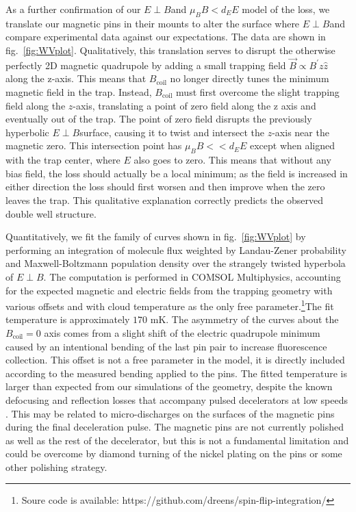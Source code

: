 \documentclass[%
 reprint,
groupedaddress,
 amsmath,amssymb,
 aps,
prl,
]{revtex4-1}
\newcommand{\epb}{$E\!\perp\!B$}
\begin{document}
As a further confirmation of our \epb and $\mu_BB<d_EE$ model of the loss, we translate our magnetic pins in their mounts to alter the surface where \epb and compare experimental data against our expectations. The data are shown in fig.~\ref{fig:WVplot}. Qualitatively, this translation serves to disrupt the otherwise perfectly 2D magnetic quadrupole by adding a small trapping field $\vec{B}\propto B^\prime z\hat{z}$ along the z-axis. This means that $B_\text{coil}$ no longer directly tunes the minimum magnetic field in the trap. Instead, $B_\text{coil}$ must first overcome the slight trapping field along the $z$-axis, translating a point of zero field along the z axis and eventually out of the trap. The point of zero field disrupts the previously hyperbolic \epb surface, causing it to twist and intersect the $z$-axis near the magnetic zero. This intersection point has $\mu_BB<< d_EE$ except when aligned with the trap center, where $E$ also goes to zero. This means that without any bias field, the loss should actually be a local minimum; as the field is increased in either direction the loss should first worsen and then improve when the zero leaves the trap. This qualitative explanation correctly predicts the observed double well structure.

Quantitatively, we fit the family of curves shown in fig.~\ref{fig:WVplot} by performing an integration of molecule flux weighted by Landau-Zener probability and Maxwell-Boltzmann population density over the strangely twisted hyperbola of \epb. The computation is performed in COMSOL Multiphysics, accounting for the expected magnetic and electric fields from the trapping geometry with various offsets and with cloud temperature as the only free parameter.\footnote{Soure code is available: https://github.com/dreens/spin-flip-integration/}The fit temperature is approximately $170\text{ mK}$. The asymmetry of the curves about the $B_\text{coil}=0$ axis comes from a slight shift of the electric quadrupole minimum caused by an intentional bending of the last pin pair to increase fluorescence collection. This offset is not a free parameter in the model, it is directly included according to the measured bending applied to the pins. The fitted temperature is larger than expected from our simulations of the geometry, despite the known defocusing and reflection losses that accompany pulsed decelerators at low speeds \cite{Sawyer2008a}. This may be related to micro-discharges on the surfaces of the magnetic pins during the final deceleration pulse. The magnetic pins are not currently polished as well as the rest of the decelerator, but this is not a fundamental limitation and could be overcome by diamond turning of the nickel plating on the pins or some other polishing strategy.
\end{document}
